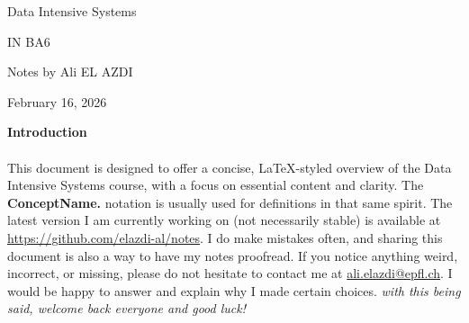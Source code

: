 \documentclass[../../compsys.tex]{subfiles}
\begin{document}
\begin{titlepage}
    \centering
    \vspace*{1cm}
    {\Huge Data Intensive Systems\par}
    \vspace{10pt}
    {\LARGE IN BA6\par}
    \vspace{10pt}
    {\Large Notes by Ali EL AZDI\par}

    \vfill
    {\large February 16, 2026\par}
\end{titlepage}

\begin{center}
    \vspace*{1cm}
    \textbf{Introduction}
    \newline
    \paragraph[short]{}{This document is designed to offer a concise, LaTeX-styled overview of the Data Intensive Systems course, with a focus on essential content and clarity. The \textbf{ConceptName.} notation is usually used for definitions in that same spirit. The latest version I am currently working on (not necessarily stable) is available at \url{https://github.com/elazdi-al/notes}. I do make mistakes often, and sharing this document is also a way to have my notes proofread. If you notice anything weird, incorrect, or missing, please do not hesitate to contact me at \href{mailto:ali.elazdi@epfl.ch}{ali.elazdi@epfl.ch}. I would be happy to answer and explain why I made certain choices.}
    \newline
    \textit{with this being said, welcome back everyone and good luck!}
\end{center}

\tableofcontents
\end{document}
